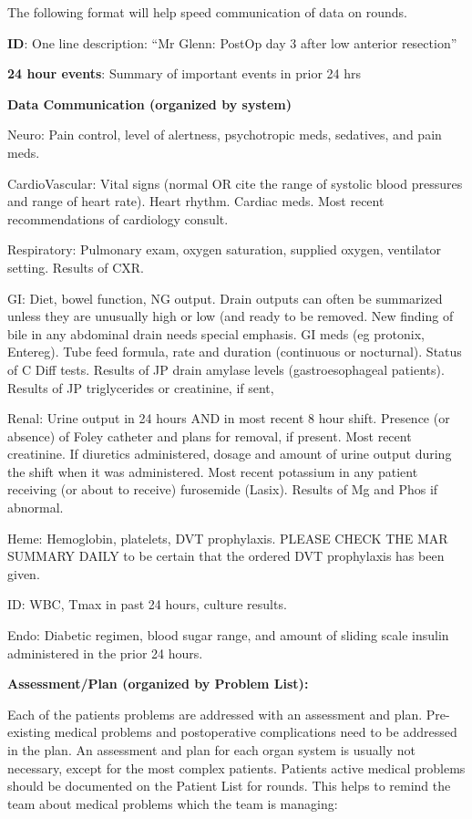 \documentclass[
]{book}
\begin{document}
The following format will help speed communication of data on rounds.

\textbf{ID}: One line description: ``Mr Glenn: PostOp day 3 after low anterior resection''

\textbf{24 hour events}: Summary of important events in prior 24 hrs

\textbf{Data Communication (organized by system)}

Neuro: Pain control, level of alertness, psychotropic meds, sedatives, and pain meds.

CardioVascular: Vital signs (normal OR cite the range of systolic blood pressures and range of heart rate). Heart rhythm. Cardiac meds. Most recent recommendations of cardiology consult.

Respiratory: Pulmonary exam, oxygen saturation, supplied oxygen, ventilator setting. Results of CXR.

GI: Diet, bowel function, NG output. Drain outputs can often be summarized unless they are unusually high or low (and ready to be removed. New finding of bile in any abdominal drain needs special emphasis. GI meds (eg protonix, Entereg). Tube feed formula, rate and duration (continuous or nocturnal). Status of C Diff tests. Results of JP drain amylase levels (gastroesophageal patients). Results of JP triglycerides or creatinine, if sent,

Renal: Urine output in 24 hours AND in most recent 8 hour shift. Presence (or absence) of Foley catheter and plans for removal, if present. Most recent creatinine. If diuretics administered, dosage and amount of urine output during the shift when it was administered. Most recent potassium in any patient receiving (or about to receive) furosemide (Lasix). Results of Mg and Phos if abnormal.

Heme: Hemoglobin, platelets, DVT prophylaxis. PLEASE CHECK THE MAR SUMMARY DAILY to be certain that the ordered DVT prophylaxis has been given.

ID: WBC, Tmax in past 24 hours, culture results.

Endo: Diabetic regimen, blood sugar range, and amount of sliding scale insulin administered in the prior 24 hours.

\textbf{Assessment/Plan (organized by Problem List):}

Each of the patients problems are addressed with an assessment and plan. Pre-existing medical problems and postoperative complications need to be addressed in the plan. An assessment and plan for each organ system is usually not necessary, except for the most complex patients. Patients active medical problems should be documented on the Patient List for rounds. This helps to remind the team about medical problems which the team is managing:
\end{document}
